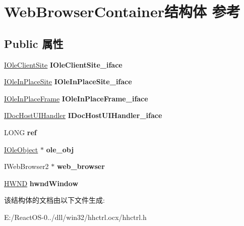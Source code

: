 \hypertarget{struct_web_browser_container}{}\section{Web\+Browser\+Container结构体 参考}
\label{struct_web_browser_container}
\subsection*{Public 属性}
\begin{DoxyCompactItemize}
\item 
\mbox{\label{struct_web_browser_container_afb5bd63d0f0fb145d32b2318dc3a3cb2}} 
\hyperlink{interface_i_ole_client_site}{I\+Ole\+Client\+Site} {\bfseries I\+Ole\+Client\+Site\+\_\+iface}
\item 
\mbox{\label{struct_web_browser_container_a49e06f67ec052c3ea3423bca1e1fb10d}} 
\hyperlink{interface_i_ole_in_place_site}{I\+Ole\+In\+Place\+Site} {\bfseries I\+Ole\+In\+Place\+Site\+\_\+iface}
\item 
\mbox{\label{struct_web_browser_container_a8ae97486802532fafb33b6a0210b08e2}} 
\hyperlink{interface_i_ole_in_place_frame}{I\+Ole\+In\+Place\+Frame} {\bfseries I\+Ole\+In\+Place\+Frame\+\_\+iface}
\item 
\mbox{\label{struct_web_browser_container_ac98bf119a8d84ac54a87ae01c7f558d6}} 
\hyperlink{interface_i_doc_host_u_i_handler}{I\+Doc\+Host\+U\+I\+Handler} {\bfseries I\+Doc\+Host\+U\+I\+Handler\+\_\+iface}
\item 
\mbox{\label{struct_web_browser_container_a4aae6211e68ff42fc0ec1ba10dc3f6d3}} 
L\+O\+NG {\bfseries ref}
\item 
\mbox{\label{struct_web_browser_container_aa2fe50c107a00202ee5d9b6cf537d4e8}} 
\hyperlink{interface_i_ole_object}{I\+Ole\+Object} $\ast$ {\bfseries ole\+\_\+obj}
\item 
\mbox{\label{struct_web_browser_container_a15eb1935456eb15a230f3a480874e92a}} 
I\+Web\+Browser2 $\ast$ {\bfseries web\+\_\+browser}
\item 
\mbox{\label{struct_web_browser_container_a93951d928b5986b68ed42101e1697d12}} 
\hyperlink{interfacevoid}{H\+W\+ND} {\bfseries hwnd\+Window}
\end{DoxyCompactItemize}


该结构体的文档由以下文件生成\+:\begin{DoxyCompactItemize}
\item 
E\+:/\+React\+O\+S-\/0../dll/win32/hhctrl.\+ocx/hhctrl.\+h\end{DoxyCompactItemize}
